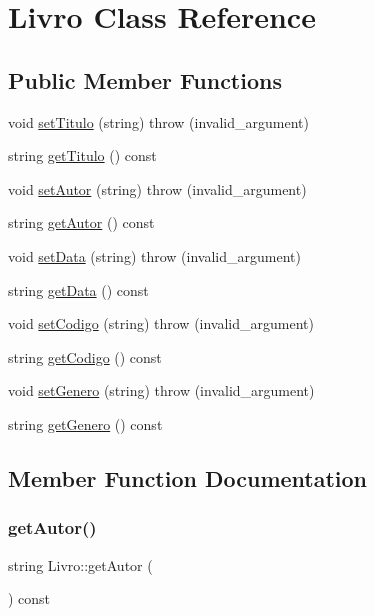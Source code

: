 \hypertarget{classLivro}{}\section{Livro Class Reference}
\label{classLivro}
\subsection*{Public Member Functions}
\begin{DoxyCompactItemize}
\item 
void \hyperlink{classLivro_a9a33b5175b4b8666a3dc3ffbbb445b7e}{set\+Titulo} (string)  throw (invalid\+\_\+argument)
\item 
string \hyperlink{classLivro_a4b4e2e74d4fa1a0e6e9a4d6c05dc3bd4}{get\+Titulo} () const
\item 
void \hyperlink{classLivro_adcc86bd3488de769173fe872c7949077}{set\+Autor} (string)  throw (invalid\+\_\+argument)
\item 
string \hyperlink{classLivro_ae8f2ea7e82a3ddd33e1d0e242c43f3e5}{get\+Autor} () const
\item 
void \hyperlink{classLivro_a3530e8f2974791461f080563fd332fa0}{set\+Data} (string)  throw (invalid\+\_\+argument)
\item 
string \hyperlink{classLivro_aaf7d614049f22c09631bae2a5f83c16a}{get\+Data} () const
\item 
void \hyperlink{classLivro_a30b6c41de98f92185b4a5f33dcdf5a66}{set\+Codigo} (string)  throw (invalid\+\_\+argument)
\item 
string \hyperlink{classLivro_ac0bf6014dae1a0a3cb15ffac8b886f13}{get\+Codigo} () const
\item 
void \hyperlink{classLivro_a780f063297948dfc6c20d564ed4a48c3}{set\+Genero} (string)  throw (invalid\+\_\+argument)
\item 
string \hyperlink{classLivro_a00b6085b059571efab6d29630cf95a50}{get\+Genero} () const
\end{DoxyCompactItemize}


\subsection{Member Function Documentation}
\mbox{\label{classLivro_ae8f2ea7e82a3ddd33e1d0e242c43f3e5}} 
\subsubsection{\texorpdfstring{get\+Autor()}{getAutor()}}
{\footnotesize\ttfamily string Livro\+::get\+Autor (\begin{DoxyParamCaption}{ }\end{DoxyParamCaption}) const\hspace{0.3cm}{\ttfamily [inline]}}

